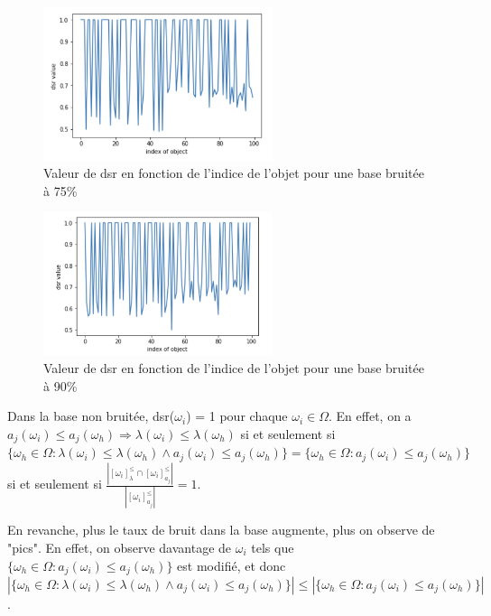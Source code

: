 \documentclass[a4paper]{article}
\begin{document}
\begin{figure}[H]
	\center 
	\includegraphics[width=0.6\textwidth]{images/dsr_75.png}
    \caption{Valeur de dsr en fonction de l'indice de l'objet pour une base
    bruitée à 75\%}
    \label{img:dsr75}
\end{figure}

\begin{figure}[H]
	\center 
	\includegraphics[width=0.6\textwidth]{images/dsr_90.png}
    \caption{Valeur de dsr en fonction de l'indice de l'objet pour une base
    bruitée à 90\%}
    \label{img:dsr90}
\end{figure}

Dans la base non bruitée, dsr($\omega_i$) = 1 pour chaque $\omega_i \in \Omega$.
En effet, on a $a_j(\omega_i) \leq a_j(\omega_h) \Rightarrow \lambda(\omega_i)
\leq \lambda(\omega_h)$ si et seulement si $\{\omega_h \in \Omega :
\lambda(\omega_i) \leq \lambda(\omega_h) \land a_j(\omega_i) \leq
a_j(\omega_h)\} = \{\omega_h \in \Omega : a_j(\omega_i) \leq a_j(\omega_h)\}$ si
et seulement si $\frac{| [\omega_i]^{\leq}_{\lambda} \cap
[\omega_i]^{\leq}_{a_j}|}{| [\omega_i]^{\leq}_{a_j} |} = 1 $.

En revanche, plus le taux de bruit dans la base augmente, plus on observe de
"pics". En effet, on observe davantage de $\omega_i$ tels que $ \{\omega_h \in
\Omega : a_j(\omega_i) \leq a_j(\omega_h)\} $ est modifié, et donc  $|
\{\omega_h \in \Omega : \lambda(\omega_i) \leq \lambda(\omega_h) \land
a_j(\omega_i) \leq a_j(\omega_h)\} | \leq | \{\omega_h \in \Omega :
a_j(\omega_i) \leq a_j(\omega_h)\} |$. \\
\end{document}
